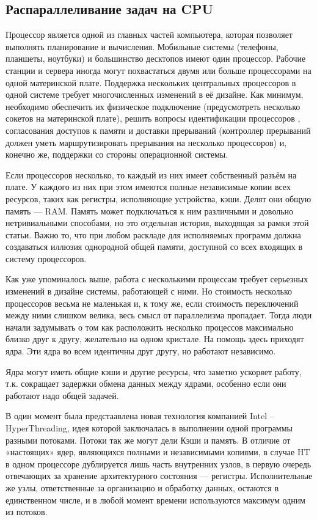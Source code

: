 \subsection{ Распараллеливание задач на CPU}
Процессор является одной из главных частей компьютера, которая позволяет выполнять планирование и вычисления. Мобильные системы (телефоны, планшеты, ноутбуки) и большинство десктопов имеют один процессор. Рабочие станции и сервера иногда могут похвастаться двумя или больше процессорами на одной материнской плате. Поддержка нескольких центральных процессоров в одной системе требует многочисленных изменений в её дизайне. Как минимум, необходимо обеспечить их физическое подключение (предусмотреть несколько сокетов на материнской плате), решить вопросы идентификации процессоров , согласования доступов к памяти и доставки прерываний (контроллер прерываний должен уметь маршрутизировать прерывания на несколько процессоров) и, конечно же, поддержки со стороны операционной системы.

Если процессоров несколько, то каждый из них имеет собственный разъём на плате. У каждого из них при этом имеются полные независимые копии всех ресурсов, таких как регистры, исполняющие устройства, кэши. Делят они общую память — RAM. Память может подключаться к ним различными и довольно нетривиальными способами, но это отдельная история, выходящая за рамки этой статьи. Важно то, что при любом раскладе для исполняемых программ должна создаваться иллюзия однородной общей памяти, доступной со всех входящих в систему процессоров.

Как уже упоминалось выше, работа с несколькими процессам требует серьезных изменений в дизайне системы, работающей с ними. Но стоимость несколько процессоров весьма не маленькая и, к тому же, если стоимость переключений между ними слишком велика, весь смысл от параллелизма пропадает. Тогда люди начали задумывать о том как расположить несколько процессов максимально близко друг к другу, желательно на одном кристале. На помощь здесь приходят ядра. Эти ядра во всем идентичны друг другу, но работают независимо.

Ядра могут иметь общие кэши и другие ресурсы, что заметно ускоряет работу, т.к. сокращает задержки обмена данных между ядрами, особенно если они работают надо общей задачей.

В один момент была предстаавлена новая технология компанией Intel -- HyperThreading, идея которой заключалась в выполнении одной программы разными потоками. Потоки так же могут дели Кэши и память. В отличие от «настоящих» ядер, являющихся полными и независимыми копиями, в случае HT в одном процессоре дублируется лишь часть внутренних узлов, в первую очередь отвечающих за хранение архитектурного состояния — регистры. Исполнительные же узлы, ответственные за организацию и обработку данных, остаются в единственном числе, и в любой момент времени используются максимум одним из потоков.

